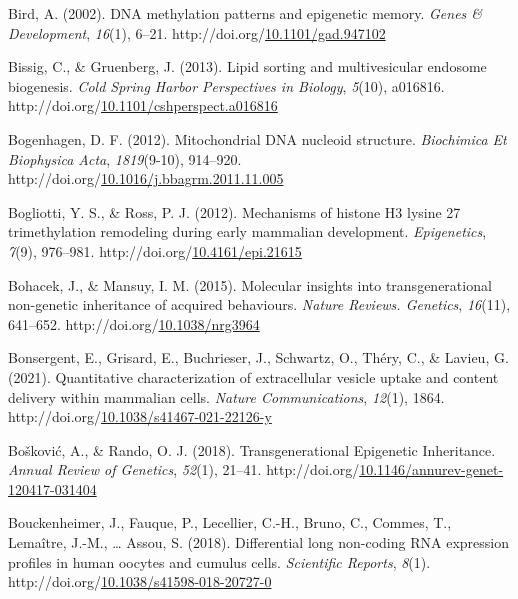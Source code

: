 \documentclass[12pt,twoside]{reedthesis}
\newlength{\cslhangindent}
\newenvironment{CSLReferences}[2] %
 {%
  \setlength{\parindent}{0pt}
  \ifodd #1 \everypar{\setlength{\hangindent}{\cslhangindent}}\ignorespaces\fi
  \ifnum #2 > 0
  \setlength{\parskip}{#2\baselineskip}
  \fi
 }%
 {}
\begin{document}
\begin{CSLReferences}{1}{0}
\leavevmode{}%
Bird, A. (2002). DNA methylation patterns and epigenetic memory. \emph{Genes \& Development}, \emph{16}(1), 6--21. http://doi.org/\href{https://doi.org/10.1101/gad.947102}{10.1101/gad.947102}

\leavevmode{}%
Bissig, C., \& Gruenberg, J. (2013). Lipid sorting and multivesicular endosome biogenesis. \emph{Cold Spring Harbor Perspectives in Biology}, \emph{5}(10), a016816. http://doi.org/\href{https://doi.org/10.1101/cshperspect.a016816}{10.1101/cshperspect.a016816}

\leavevmode{}%
Bogenhagen, D. F. (2012). Mitochondrial DNA nucleoid structure. \emph{Biochimica Et Biophysica Acta}, \emph{1819}(9-10), 914--920. http://doi.org/\href{https://doi.org/10.1016/j.bbagrm.2011.11.005}{10.1016/j.bbagrm.2011.11.005}

\leavevmode{}%
Bogliotti, Y. S., \& Ross, P. J. (2012). Mechanisms of histone H3 lysine 27 trimethylation remodeling during early mammalian development. \emph{Epigenetics}, \emph{7}(9), 976--981. http://doi.org/\href{https://doi.org/10.4161/epi.21615}{10.4161/epi.21615}

\leavevmode{}%
Bohacek, J., \& Mansuy, I. M. (2015). Molecular insights into transgenerational non-genetic inheritance of acquired behaviours. \emph{Nature Reviews. Genetics}, \emph{16}(11), 641--652. http://doi.org/\href{https://doi.org/10.1038/nrg3964}{10.1038/nrg3964}

\leavevmode{}%
Bonsergent, E., Grisard, E., Buchrieser, J., Schwartz, O., Théry, C., \& Lavieu, G. (2021). Quantitative characterization of extracellular vesicle uptake and content delivery within mammalian cells. \emph{Nature Communications}, \emph{12}(1), 1864. http://doi.org/\href{https://doi.org/10.1038/s41467-021-22126-y}{10.1038/s41467-021-22126-y}

\leavevmode{}%
Bošković, A., \& Rando, O. J. (2018). Transgenerational Epigenetic Inheritance. \emph{Annual Review of Genetics}, \emph{52}(1), 21--41. http://doi.org/\href{https://doi.org/10.1146/annurev-genet-120417-031404}{10.1146/annurev-genet-120417-031404}

\leavevmode{}%
Bouckenheimer, J., Fauque, P., Lecellier, C.-H., Bruno, C., Commes, T., Lemaître, J.-M., \ldots{} Assou, S. (2018). Differential long non-coding RNA expression profiles in human oocytes and cumulus cells. \emph{Scientific Reports}, \emph{8}(1). http://doi.org/\href{https://doi.org/10.1038/s41598-018-20727-0}{10.1038/s41598-018-20727-0}


\end{CSLReferences}
\end{document}
